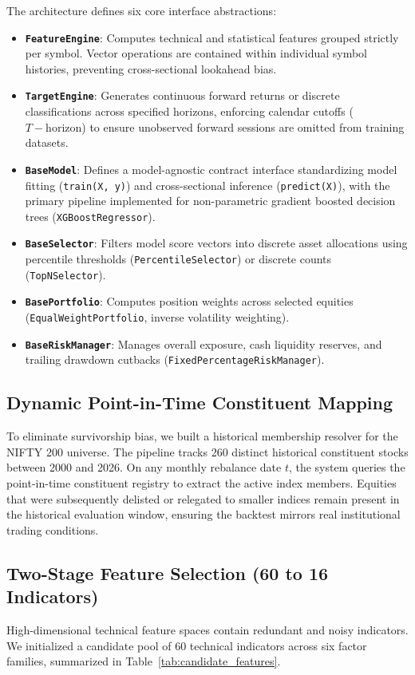The architecture defines six core interface abstractions:
\begin{itemize}
    \item \textbf{\texttt{FeatureEngine}}: Computes technical and statistical features grouped strictly per symbol. Vector operations are contained within individual symbol histories, preventing cross-sectional lookahead bias.
    \item \textbf{\texttt{TargetEngine}}: Generates continuous forward returns or discrete classifications across specified horizons, enforcing calendar cutoffs ($T - \text{horizon}$) to ensure unobserved forward sessions are omitted from training datasets.
    \item \textbf{\texttt{BaseModel}}: Defines a model-agnostic contract interface standardizing model fitting (\texttt{train(X, y)}) and cross-sectional inference (\texttt{predict(X)}), with the primary pipeline implemented for non-parametric gradient boosted decision trees (\texttt{XGBoostRegressor}).
    \item \textbf{\texttt{BaseSelector}}: Filters model score vectors into discrete asset allocations using percentile thresholds (\texttt{PercentileSelector}) or discrete counts (\texttt{TopNSelector}).
    \item \textbf{\texttt{BasePortfolio}}: Computes position weights across selected equities (\texttt{EqualWeightPortfolio}, inverse volatility weighting).
    \item \textbf{\texttt{BaseRiskManager}}: Manages overall exposure, cash liquidity reserves, and trailing drawdown cutbacks (\texttt{FixedPercentageRiskManager}).
\end{itemize}

\subsection{Dynamic Point-in-Time Constituent Mapping}
To eliminate survivorship bias, we built a historical membership resolver for the NIFTY 200 universe. The pipeline tracks 260 distinct historical constituent stocks between 2000 and 2026. On any monthly rebalance date $t$, the system queries the point-in-time constituent registry to extract the active index members. Equities that were subsequently delisted or relegated to smaller indices remain present in the historical evaluation window, ensuring the backtest mirrors real institutional trading conditions.

\subsection{Two-Stage Feature Selection (60 to 16 Indicators)}
High-dimensional technical feature spaces contain redundant and noisy indicators. We initialized a candidate pool of 60 technical indicators across six factor families, summarized in Table~\ref{tab:candidate_features}.

